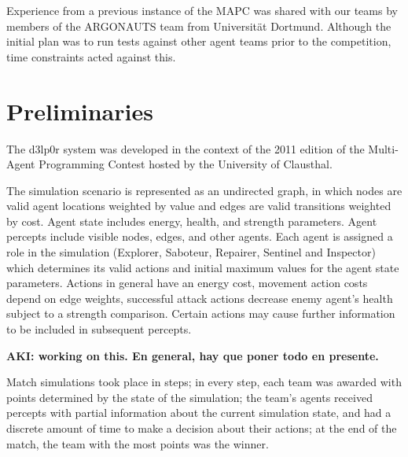 \documentclass{llncs2e/llncs}
\begin{document}
    Experience from a previous instance of the MAPC was shared with our teams by 
    members of the ARGONAUTS team from Universität Dortmund. Although the initial 
    plan was to run tests against other agent teams prior to the competition, time 
    constraints acted against this.

\section{Preliminaries}

    The d3lp0r system was developed in the context of the 2011 edition of the
    Multi-Agent Programming Contest hosted by the University of Clausthal. 

    The simulation scenario is represented as an undirected graph, in which 
    nodes are valid agent locations weighted by value and edges are valid
    transitions weighted by cost. 
    Agent state includes energy, health, and strength parameters. Agent percepts
    include visible nodes, edges, and other agents. 
    Each agent is assigned a role in the simulation (Explorer, Saboteur,
    Repairer, Sentinel and Inspector) which determines its valid actions and
    initial maximum values for the agent state parameters. 
    Actions in general have an energy cost, movement action costs depend on edge
    weights, successful attack actions decrease enemy agent's health subject to
    a strength comparison. Certain actions may cause further information to be
    included in subsequent percepts. 

    \textbf{AKI: working on this. En general, hay que poner todo en presente.}

    Match simulations took place in steps; in every step, each team was awarded 
    with points determined by the state of the simulation; the team's agents 
    received percepts with partial information about the current simulation state, 
    and had a discrete amount of time to make a decision about their actions; at 
    the end of the match, the team with the most points was the winner.
\end{document}
